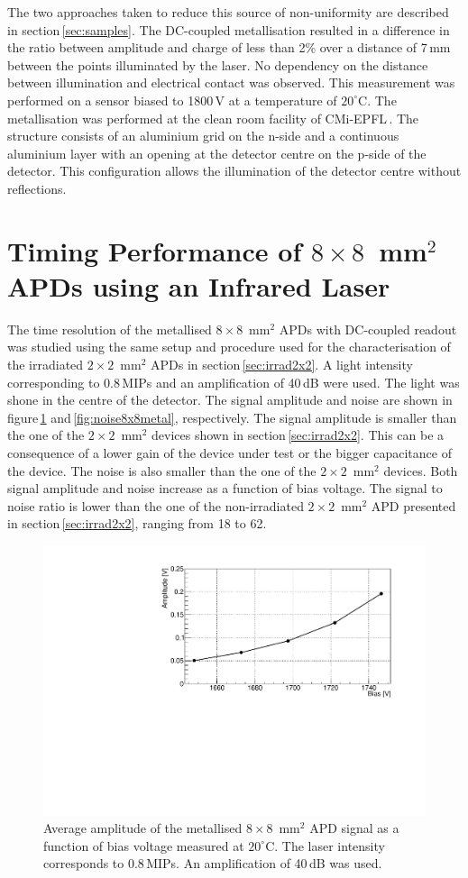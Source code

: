 \documentclass{article}
\begin{document}
The two approaches taken to reduce this source of non-uniformity are described in section\,\ref{sec:samples}.
The DC-coupled metallisation resulted in a difference in the ratio between amplitude and charge of less than 2\% over a distance of 7\,mm between the points illuminated by the laser.
No dependency on the distance between illumination and electrical contact was observed.
This measurement was performed on a sensor biased to 1800\,V at a temperature of $20^\circ$C.
The metallisation was performed at the clean room facility of CMi-EPFL\,\cite{cmi}.
The structure consists of an aluminium grid on the n-side and a continuous aluminium layer with an opening at the detector centre on the p-side of the detector.
This configuration allows the illumination of the detector centre without reflections.

\section{Timing Performance of $8 \times 8$~mm$^2$ APDs using an Infrared Laser}
\label{sec:timing8x8laser}

The time resolution of the metallised $8 \times 8$~mm$^2$ APDs with DC-coupled readout was studied using the same setup and procedure used for the characterisation of the irradiated $2 \times 2$~mm$^2$ APDs in section\,\ref{sec:irrad2x2}.
A light intensity corresponding to 0.8\,MIPs and an amplification of 40\,dB were used.
The light was shone in the centre of the detector.
The signal amplitude and noise are shown in figure\,\ref{fig:ampli8x8metal} and\,\ref{fig:noise8x8metal}, respectively.
The signal amplitude is smaller than the one of the $2 \times 2$~mm$^2$ devices shown in section\,\ref{sec:irrad2x2}.
This can be a consequence of a lower gain of the device under test or the bigger capacitance of the device.
The noise is also smaller than the one of the $2 \times 2$~mm$^2$ devices.
Both signal amplitude and noise increase as a function of bias voltage.
The signal to noise ratio is lower than the one of the non-irradiated $2 \times 2$~mm$^2$ APD presented in section\,\ref{sec:irrad2x2}, ranging from 18 to 62.

\begin{figure}
  \centering
  \includegraphics[width = 0.6 \textwidth]{ampli8x8metal}
  \caption{Average amplitude of the metallised $8 \times 8$~mm$^2$ APD signal as a function of bias voltage measured at $20^\circ$C. The laser intensity corresponds to 0.8\,MIPs. An amplification of 40\,dB was used.}
  \label{fig:ampli8x8metal}
\end{figure}
\end{document}
